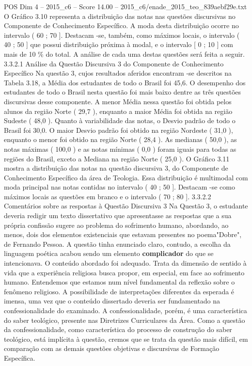 \begin{textsample}{POS Dim 4 – 2015\_c6 – Score 14.00 – 2015\_c6/enade\_2015\_teo\_839aebf29e.txt}
O Gráfico 3.10 representa a distribuição das notas nas questões discursivas no Componente de Conhecimento Específico.
A moda desta distribuição ocorre no intervalo ( 60 ; 70 ].
Destacam -se, também, como máximos locais, o intervalo ( 40 ; 50 ] que possui distribuição próxima à modal, e o intervalo [ 0 ; 10 ] com mais de 10 \% do total.
A análise de cada uma destas questões será feita a seguir. 3.3.2.1 Análise da Questão Discursiva 3 do Componente de Conhecimento Específico Na questão 3, cujos resultados aferidos encontram -se descritos na Tabela 3.18, a Média dos estudantes de todo o Brasil foi 45,6.
O desempenho dos estudantes de todo o Brasil nesta questão foi mais baixo dentre as três questões discursivas desse componente.
A menor Média nessa questão foi obtida pelos alunos da região Norte ( 29,7 ), enquanto a maior Média foi obtida na região Sudeste ( 48,0 ).
Quanto à variabilidade das notas, o Desvio padrão de todo o Brasil foi 30,0.
O maior Desvio padrão foi obtido na região Nordeste ( 31,0 ), enquanto o menor foi obtido na região Norte ( 28,4 ).
As medianas ( 50,0 ), as notas máximas ( 100,0 ) e as notas mínimas ( 0,0 ) foram iguais para todas as regiões do Brasil, exceto a Mediana na região Norte ( 25,0 ).
O Gráfico 3.11 mostra a distribuição das notas na questão discursiva 3, do Componente de Conhecimento Específico da área de Teologia.
Essa distribuição é multimodal com moda principal nas notas contidas no intervalo ( 40 ; 50 ].
Destacam -se como máximos locais as questões em branco e o intervalo ( 70 ; 80 ]. 3.3.2.2 Comentários sobre as respostas à Questão Discursiva 3 Na Questão 3, o estudante deveria redigir um texto dissertativo que apresentasse as respostas que a sua própria confissão sugere ao problema do sofrimento humano, abordando, ao menos, dois dos elementos existenciais que estavam presentes no poema"Dobre", de Fernando Pessoa.
A questão tinha enunciado claro, contudo, a escolha da linguagem poética acabou sendo um elemento \textbf{complicador} do que se intencionava.
O conteúdo abordado foi adequado.
Trata da dimensão de sentido à vida que a experiência religiosa busca propor, em especial, em face ao sofrimento humano.
Entendemos que estamos num nível fundamental da reflexão sobre o fenômeno religioso.
A possibilidade de interpretações diferentes da esperada é imensa, uma vez que o conteúdo dissertado deveria ser fundamentado na confessionalidade do examinado.
A confessionalidade, porém, é uma característica do saber teológico, presente nas Diretrizes Curriculares da Área.
Como a questão da confessionalidade, como característica do processo de construção do saber teológico, está implícita à questão, cremos que se trata da questão mais difícil, em comparação com as demais questões objetivas e discursivas de Formação Específica.

\end{textsample}
